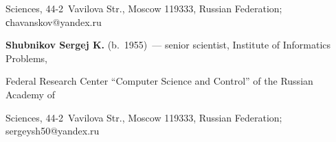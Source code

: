 Sciences, 44-2~Vavilova Str., Moscow 119333, Russian Federation; \mbox{сhavanskov@yandex.ru}





\vspace*{3pt}





\noindent


\textbf{Shubnikov Sergej K.} (b.\ 1955)~--- senior scientist, Institute of Informatics Problems,


Federal Research Center ``Computer Science and Control'' of the Russian Academy of


Sciences, 44-2~Vavilova Str., Moscow 119333, Russian Federation; \mbox{sergeysh50@yandex.ru}


      


     


     


\label{end\stat}








\renewcommand{\bibname}{\protect\rm Литература}


     


